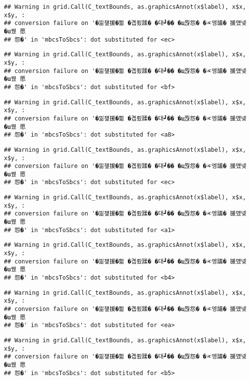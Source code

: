 \documentclass[
]{article}
\begin{document}
\begin{verbatim}
## Warning in grid.Call(C_textBounds, as.graphicsAnnot(x$label), x$x, x$y, :
## conversion failure on '�낆쟾援�쁾 �곕룄蹂� �대┛�� �щ쭩怨� �ㅼ엥議� 援먰넻�ш퀬 愿
## 怨�' in 'mbcsToSbcs': dot substituted for <ec>
\end{verbatim}

\begin{verbatim}
## Warning in grid.Call(C_textBounds, as.graphicsAnnot(x$label), x$x, x$y, :
## conversion failure on '�낆쟾援�쁾 �곕룄蹂� �대┛�� �щ쭩怨� �ㅼ엥議� 援먰넻�ш퀬 愿
## 怨�' in 'mbcsToSbcs': dot substituted for <bf>
\end{verbatim}

\begin{verbatim}
## Warning in grid.Call(C_textBounds, as.graphicsAnnot(x$label), x$x, x$y, :
## conversion failure on '�낆쟾援�쁾 �곕룄蹂� �대┛�� �щ쭩怨� �ㅼ엥議� 援먰넻�ш퀬 愿
## 怨�' in 'mbcsToSbcs': dot substituted for <a8>
\end{verbatim}

\begin{verbatim}
## Warning in grid.Call(C_textBounds, as.graphicsAnnot(x$label), x$x, x$y, :
## conversion failure on '�낆쟾援�쁾 �곕룄蹂� �대┛�� �щ쭩怨� �ㅼ엥議� 援먰넻�ш퀬 愿
## 怨�' in 'mbcsToSbcs': dot substituted for <ec>
\end{verbatim}

\begin{verbatim}
## Warning in grid.Call(C_textBounds, as.graphicsAnnot(x$label), x$x, x$y, :
## conversion failure on '�낆쟾援�쁾 �곕룄蹂� �대┛�� �щ쭩怨� �ㅼ엥議� 援먰넻�ш퀬 愿
## 怨�' in 'mbcsToSbcs': dot substituted for <a1>
\end{verbatim}

\begin{verbatim}
## Warning in grid.Call(C_textBounds, as.graphicsAnnot(x$label), x$x, x$y, :
## conversion failure on '�낆쟾援�쁾 �곕룄蹂� �대┛�� �щ쭩怨� �ㅼ엥議� 援먰넻�ш퀬 愿
## 怨�' in 'mbcsToSbcs': dot substituted for <b4>
\end{verbatim}

\begin{verbatim}
## Warning in grid.Call(C_textBounds, as.graphicsAnnot(x$label), x$x, x$y, :
## conversion failure on '�낆쟾援�쁾 �곕룄蹂� �대┛�� �щ쭩怨� �ㅼ엥議� 援먰넻�ш퀬 愿
## 怨�' in 'mbcsToSbcs': dot substituted for <ea>
\end{verbatim}

\begin{verbatim}
## Warning in grid.Call(C_textBounds, as.graphicsAnnot(x$label), x$x, x$y, :
## conversion failure on '�낆쟾援�쁾 �곕룄蹂� �대┛�� �щ쭩怨� �ㅼ엥議� 援먰넻�ш퀬 愿
## 怨�' in 'mbcsToSbcs': dot substituted for <b5>
\end{verbatim}
\end{document}
